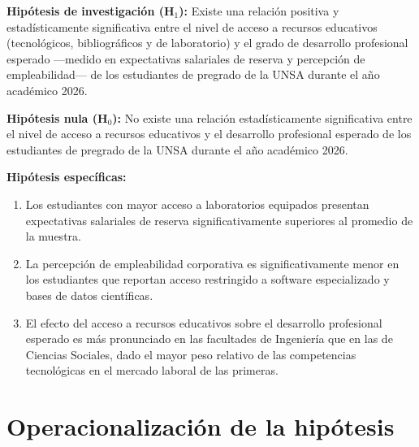 \documentclass[11pt, a4paper]{article}
\begin{document}
\textbf{Hipótesis de investigación (H$_1$):} Existe una relación positiva y estadísticamente significativa entre el nivel de acceso a recursos educativos (tecnológicos, bibliográficos y de laboratorio) y el grado de desarrollo profesional esperado —medido en expectativas salariales de reserva y percepción de empleabilidad— de los estudiantes de pregrado de la UNSA durante el año académico 2026.

\textbf{Hipótesis nula (H$_0$):} No existe una relación estadísticamente significativa entre el nivel de acceso a recursos educativos y el desarrollo profesional esperado de los estudiantes de pregrado de la UNSA durante el año académico 2026.

\textbf{Hipótesis específicas:}
\begin{enumerate}
    \item Los estudiantes con mayor acceso a laboratorios equipados presentan expectativas salariales de reserva significativamente superiores al promedio de la muestra.
    \item La percepción de empleabilidad corporativa es significativamente menor en los estudiantes que reportan acceso restringido a software especializado y bases de datos científicas.
    \item El efecto del acceso a recursos educativos sobre el desarrollo profesional esperado es más pronunciado en las facultades de Ingeniería que en las de Ciencias Sociales, dado el mayor peso relativo de las competencias tecnológicas en el mercado laboral de las primeras.
\end{enumerate}

\section{Operacionalización de la hipótesis}
\end{document}
